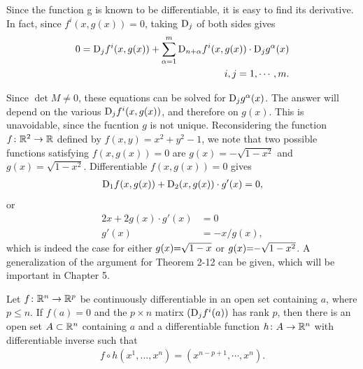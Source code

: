 Since the function g is known to be differentiable, it is easy
to find its derivative. In fact, since $f^i(x,g(x)) = 0$, taking $\mathrm{D}_j$
of both sides gives 
\begin{align*}
    0 = \mathrm{D}_jf^i(x, g(x)) + \sum_{\alpha=1}^{m}{\mathrm{D}_{n+\alpha}f^i(x, g(x))\cdot \mathrm{D}_jg^\alpha(x)} \\
    i,j = 1, \cdots, m.
\end{align*}

Since $\det M\neq 0$, these equations can be solved for $\mathrm{D}_jg^\alpha(x)$.
The answer will depend on the various $\mathrm{D}_jf^i(x, g(x))$, and therefore 
on $g(x)$. This is unavoidable, since the fucntion $g$ is not unique.
Reconsidering the function $f\colon{}\mathbb{R}^2\to \mathbb{R}$ defined by $f(x, y) = x^2 + y^2 -1$, we 
note that two possible functions satisfying $f(x, g(x)) = 0$ are $g(x) = -\sqrt{1-x^2}$ and 
$g(x) = \sqrt{1-x^2}$. Differentiable $f(x, g(x)) = 0$ gives 
\begin{align*}
    \mathrm{D}_1f(x, g(x)) + \mathrm{D}_2(x, g(x))\cdot g'(x) = 0,
\end{align*}
or 
\begin{align*}
  2x + 2g(x)\cdot g'(x) & = 0\\
  g'(x) &  = -x/g(x),
\end{align*}
which is indeed the case for either 
$g(x)\hspace*{-3pt} =\hspace*{-3pt} \sqrt{1-x}$ or $g(x)\hspace*{-3pt} =\hspace*{-3pt} -\sqrt{1-x^2}$.
A generalization of the argument for Theorem 2-12 can be given, which will be important in Chapter 5. 

\begin{theorem}
    Let $f\colon{}\mathbb{R}^n\to \mathbb{R}^p$ be continuously differentiable in an open set 
    containing $a$, where $p\le n$. If $f(a)=0$ and the $p\times n$ matirx $(\mathrm{D}_jf^i(a))$ has 
    rank $p$, then there is an open set $A\subset \mathbb{R}^n$ containing $a$ and a differentiable 
    function $h\colon{}A\to \mathbb{R}^n$ with differentiable inverse such that 
    \begin{align*}
        f\circ h(x^1, \dots, x^n) = (x^{n-p+1}, \cdots, x^n).
    \end{align*}  
\end{theorem}

